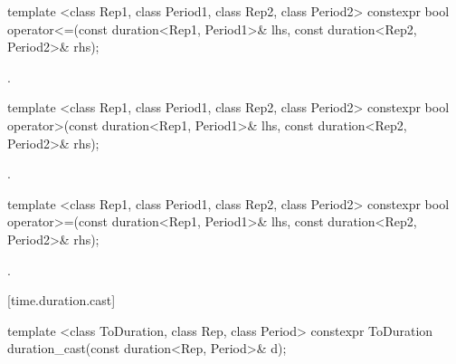 %
\begin{itemdecl}
template <class Rep1, class Period1, class Rep2, class Period2>
  constexpr bool operator<=(const duration<Rep1, Period1>& lhs, const duration<Rep2, Period2>& rhs);
\end{itemdecl}

\begin{itemdescr}
\pnum
\returns {}.
\end{itemdescr}

%
\begin{itemdecl}
template <class Rep1, class Period1, class Rep2, class Period2>
  constexpr bool operator>(const duration<Rep1, Period1>& lhs, const duration<Rep2, Period2>& rhs);
\end{itemdecl}

\begin{itemdescr}
\pnum
\returns {}.
\end{itemdescr}

%
\begin{itemdecl}
template <class Rep1, class Period1, class Rep2, class Period2>
  constexpr bool operator>=(const duration<Rep1, Period1>& lhs, const duration<Rep2, Period2>& rhs);
\end{itemdecl}

\begin{itemdescr}
\pnum
\returns {}.
\end{itemdescr}

[time.duration.cast]{}

%
%
\begin{itemdecl}
template <class ToDuration, class Rep, class Period>
  constexpr ToDuration duration_cast(const duration<Rep, Period>& d);
\end{itemdecl}

